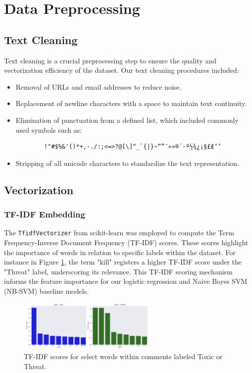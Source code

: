 \section{Data Preprocessing}

\subsection{Text Cleaning}
Text cleaning is a crucial preprocessing step to ensure the quality and vectorization efficiency of the dataset. Our text cleaning procedures included:
\begin{itemize}
    \item Removal of URLs and email addresses to reduce noise.
    \item Replacement of newline characters with a space to maintain text continuity.
    \item Elimination of punctuation from a defined list, which included commonly used symbols such as:
    \begin{verbatim}
        !"#$%&'()*+,-./:;<=>?@[\]^_`{|}~“”¨«»®´·º½¾¿¡§£₤‘’
    \end{verbatim}
    \item Stripping of all unicode characters to standardize the text representation.
\end{itemize}

\subsection{Vectorization}
    \subsubsection{TF-IDF Embedding}
        The \texttt{TfidfVectorizer} from scikit-learn was employed to compute the Term Frequency-Inverse Document Frequency (TF-IDF) scores. These scores highlight the importance of words in relation to specific labels within the dataset. For instance in Figure \ref{fig:tfidf_scores}, the term "kill" registers a higher TF-IDF score under the "Threat" label, underscoring its relevance. This TF-IDF scoring mechanism informs the feature importance for our logistic regression and Naive Bayes SVM (NB-SVM) baseline models.

        \begin{figure}
            \centering
            \includegraphics[width=0.6\textwidth]{images/data_analysis/TFIDF_WordCount.png}
            \caption{TF-IDF scores for select words within comments labeled Toxic or Threat.}
            \label{fig:tfidf_scores}
        \end{figure}

